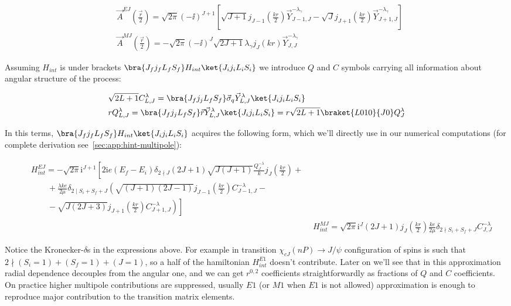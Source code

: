 \begin{align}
    &\vec{A}^{EJ}(\frac{\vec{r}}{2}) = \sqrt{2\pi} (-\ii)^{J+1} \left[ \sqrt{J+1} j_{J-1}(\frac{kr}{2}) \vec{Y}^{-\lambda_\gamma}_{J-1, J} - \sqrt{J} j_{J+1}(\frac{kr}{2}) \vec{Y}^{-\lambda_\gamma}_{J+1, J} \right] \\
    &\vec{A}^{MJ}(\frac{\vec{r}}{2}) = -\sqrt{2\pi} (-\ii)^J \sqrt{2J+1} \lambda_\gamma j_J(k r) \vec{Y}^{-\lambda_\gamma}_{J,J}
\end{align}

Assuming $H_{int}$ is under brackets $\bra{J_f j_f L_f S_f} H_{int} \ket{J_i j_i L_i S_i}$  we introduce $Q$ and $C$ symbols carrying all information about angular structure of the process:

\begin{align}
    &\sqrt{2L+1} C^\lambda_{L, J} = \bra{J_f j_j L_f S_f} \vec{\sigma}_q \vec{Y}^{\lambda}_{L, J} \ket{J_i j_i L_i S_i} \\
    &r Q^{\lambda}_{L, J} = \bra{J_f j_j L_f S_f} \vec{r} \vec{Y}^{\lambda}_{L, J} \ket{J_i j_i L_i S_i} = r \sqrt{2L+1} \braket{L010}{J0} Q^\lambda_J
\end{align}

In this terms, $\bra{J_f j_f L_f S_f} H_{int} \ket{J_i j_i L_i S_i}$ acquires the following form, which we'll directly use in our numerical computations (for complete derivation see~\cref{sec:app:hint-multipole}):

\begin{align}
    \begin{split}
        &H_{int}^{EJ} = -\sqrt{2\pi} \mathrm{i}^{J+1} \left[ 2 \mathrm{i} e (E_f-E_i) \delta_{2 \nmid J} (2J+1) \sqrt{J(J+1)} \frac{Q_{J}^{- \lambda}}{k} j_{J}(\frac{kr}{2}) + \right.\\
        &\qquad + \frac{\lambda k e}{2 \mu} \delta_{2 \mid S_i + S_f + J} \left( \sqrt{(J+1)(2J-1)} j_{J-1}(\frac{kr}{2}) C_{J-1, J}^{- \lambda} - \right.\\
        &\qquad -\left. \left. \sqrt{J(2J+3)} j_{J+1}(\frac{kr}{2}) C_{J+1, J}^{- \lambda} \right) \right]
    \end{split} \\
    &H_{int}^{MJ} = \sqrt{2\pi} \mathrm{i}^{J} (2J+1) j_J(\frac{kr}{2}) \frac{k e}{2 \mu} \delta_{2 \nmid S_i + S_f +J} C_{J, J}^{- \lambda}
\end{align}

Notice the Kronecker-$\delta$s in the expressions above. For example in transition $\chi_{cJ}(nP) \rightarrow J/\psi$ configuration of spins is such that $2 \nmid (S_i=1) + (S_f=1) + (J=1)$, so a half of the hamiltonian $H^{E1}_{int}$ doesn't contribute. Later on we'll see that in this approximation radial dependence decouples from the angular one, and we can get $r^{0,2}$ coefficients straightforwardly as fractions of $Q$ and $C$ coefficients. On practice higher multipole contributions are suppressed, usually $E1$ (or $M1$ when $E1$ is not allowed) approximation is enough to reproduce major contribution to the transition matrix elements.
